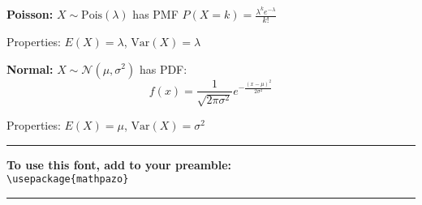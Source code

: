 \documentclass[10pt]{article}
\newcommand{\var}{\textrm{Var}}
\newcommand{\N}{\mathcal{N}}
\newcommand{\Pois}{\textrm{Pois}}
\begin{document}
\textbf{Poisson:} $X \sim \Pois(\lambda)$ has PMF $P(X = k) = \frac{\lambda^k e^{-\lambda}}{k!}$

Properties: $E(X) = \lambda$, $\var(X) = \lambda$

\textbf{Normal:} $X \sim \N(\mu, \sigma^2)$ has PDF:
\[f(x) = \frac{1}{\sqrt{2\pi\sigma^2}} e^{-\frac{(x-\mu)^2}{2\sigma^2}}\]

Properties: $E(X) = \mu$, $\var(X) = \sigma^2$

\vspace{1cm}
\begin{center}
\rule{\textwidth}{0.4pt}

\textbf{To use this font, add to your preamble:} \\
\verb|\usepackage{mathpazo}|

\rule{\textwidth}{0.4pt}
\end{center}
\end{document}
